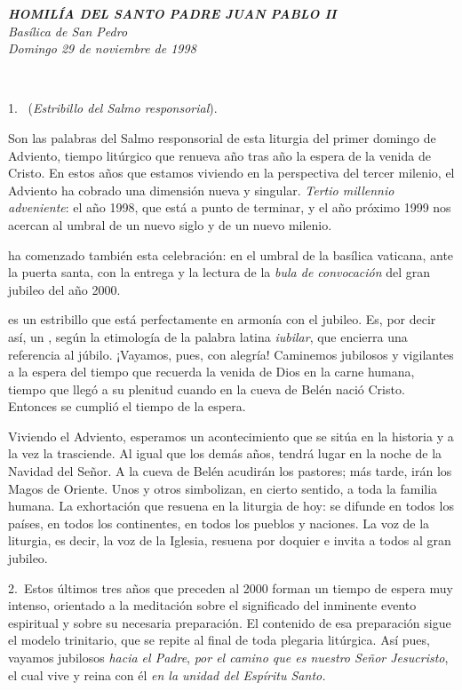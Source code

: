\emph{\textbf{HOMILÍA DEL SANTO PADRE JUAN PABLO II\\[2\baselineskip]\hspace*{0.333em}}Basílica de San Pedro\\ Domingo 29 de noviembre de 1998}

~

1.~ (\emph{Estribillo del Salmo responsorial}).

Son las palabras del Salmo responsorial de esta liturgia del primer domingo de Adviento, tiempo litúrgico que renueva año tras año la espera de la venida de Cristo. En estos años que estamos viviendo en la perspectiva del tercer milenio, el Adviento ha cobrado una dimensión nueva y singular. \emph{Tertio millennio adveniente}: el año 1998, que está a punto de terminar, y el año próximo 1999 nos acercan al umbral de un nuevo siglo y de un nuevo milenio.

 ha comenzado también esta celebración: en el umbral de la basílica vaticana, ante la puerta santa, con la entrega y la lectura de la \emph{bula de convocación} del gran jubileo del año 2000.

 es un estribillo que está perfectamente en armonía con el jubileo. Es, por decir así, un , según la etimología de la palabra latina \emph{iubilar}, que encierra una referencia al júbilo. ¡Vayamos, pues, con alegría! Caminemos jubilosos y vigilantes a la espera del tiempo que recuerda la venida de Dios en la carne humana, tiempo que llegó a su plenitud cuando en la cueva de Belén nació Cristo. Entonces se cumplió el tiempo de la espera.

Viviendo el Adviento, esperamos un acontecimiento que se sitúa en la historia y a la vez la trasciende. Al igual que los demás años, tendrá lugar en la noche de la Navidad del Señor. A la cueva de Belén acudirán los pastores; más tarde, irán los Magos de Oriente. Unos y otros simbolizan, en cierto sentido, a toda la familia humana. La exhortación que resuena en la liturgia de hoy:  se difunde en todos los países, en todos los continentes, en todos los pueblos y naciones. La voz de la liturgia, es decir, la voz de la Iglesia, resuena por doquier e invita a todos al gran jubileo.

2.~Estos últimos tres años que preceden al 2000 forman un tiempo de espera muy intenso, orientado a la meditación sobre el significado del inminente evento espiritual y sobre su necesaria preparación. El contenido de esa preparación sigue el modelo trinitario, que se repite al final de toda plegaria litúrgica. Así pues, vayamos jubilosos \emph{hacia el Padre}, \emph{por el camino que es nuestro Señor Jesucristo}, el cual vive y reina con él \emph{en la unidad del Espíritu Santo.}

